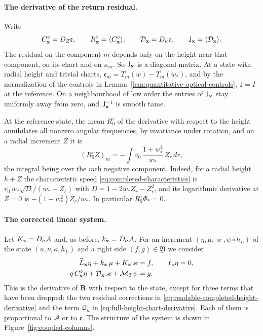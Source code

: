 \paragraph{The derivative of the return residual.}
Write
\begin{equation}\label{eq:joint-circle-linear-rows}
 C_{\mathbf x}^{\circ}=D_Z\mathfrak e,\qquad
 R_{\mathbf x}^{\circ}=\langle C_{\mathbf x}^{\circ}\rangle,\qquad
 \mathcal D_{\mathbf x}=D_\kappa\mathfrak e,\qquad
 \mathsf J_{\mathbf x}=\langle \mathcal D_{\mathbf x}\rangle .
\end{equation}
The residual on the component $m$ depends only on the height near
that component, on its chart and on $\kappa_m$. So $\mathsf J_{\mathbf x}$
is a diagonal matrix. At a state with radial height and trivial
charts, $\mathfrak e_m=T_m(w)-T_m(w_*)$, and by the normalization of
the controls in Lemma~\ref{lem:quantitative-optical-controls},
$\mathsf J=I$ at the reference. On a neighbourhood of low order the
entries of $\mathsf J_{\mathbf x}$ stay uniformly away from zero, and
$\mathsf J_{\mathbf x}^{-1}$ is smooth tame.

At the reference state, the mean $R_0^\circ$ of the derivative with
respect to the height annihilates all nonzero angular frequencies, by
invariance under rotation, and on a radial increment $Z$ it is
\begin{equation}\label{eq:rewrite-reference-circle-row}
 (R_0^\circ Z)_m
 =-\int v_0\,\frac{1+w_*^2}{w_*}\,Z_r\,dr ,
\end{equation}
the integral being over the $m$th negative component. Indeed, for a
radial height $h+Z$ the characteristic speed
\eqref{eq:completed-characteristics} is
$v_0\,w_*\sqrt D/(w_*+Z_r)$ with $D=1-2w_*Z_r-Z_r^2$, and its
logarithmic derivative at $Z=0$ is $-(1+w_*^2)Z_r/w_*$. In particular
$R_0^\circ\Phi_*=0$.

\paragraph{The corrected linear system.}
Let $K_{\mathbf x}=D_\kappa\mathcal A$ and, as before,
$k_{\mathbf x}=D_\nu\mathcal A$. For an increment
$(\eta,\mu,\varkappa,\psi\circ h_L)$ of the state
$(u,\nu,\kappa,h_L)$ and a right side $(f,g)\in\mathfrak Y$ we
consider
\begin{equation}\label{eq:corrected-coupled-linear-system}
 \begin{split}
 \widehat L_{\mathbf x}\eta+k_{\mathbf x}\,\mu+K_{\mathbf x}\,\varkappa&=f,
                    \qquad \ell_*\eta=0,\\
 q\,C_{\mathbf x}^{\circ}\eta+\mathcal D_{\mathbf x}\,\varkappa
                            +\mathcal M_T\psi&=g .
 \end{split}
\end{equation}
This is the derivative of $\mathbf R$ with respect to the state,
except for three terms that have been dropped: the two residual
corrections in \eqref{eq:readable-completed-height-derivative} and the
term $\mathcal Q_h$ in \eqref{eq:full-height-chart-derivative}. Each
of them is proportional to $\mathcal A$ or to $\mathfrak e$. The
structure of the system is shown in Figure~\ref{fig:coupled-columns}.

